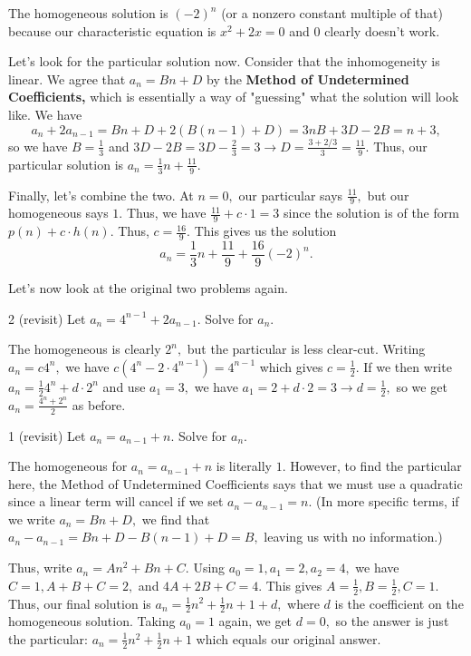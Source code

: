 \begin{solution}
    The homogeneous solution is $(-2)^n$ (or a nonzero constant multiple of that) because our characteristic equation is $x^2+2x=0$ and $0$ clearly doesn't work.

    Let's look for the particular solution now. Consider that the inhomogeneity is linear. We agree that $a_n=Bn+D$ by the \textbf{Method of Undetermined Coefficients,} which is essentially a way of "guessing" what the solution will look like. We have $$a_n+2a_{n-1}=Bn+D+2(B(n-1)+D)=3nB+3D-2B=n+3,$$ so we have $B=\frac{1}{3}$ and $3D-2B=3D-\frac{2}{3}=3\rightarrow D=\frac{3+2/3}{3}=\frac{11}{9}.$ Thus, our particular solution is $a_n=\frac{1}{3}n+\frac{11}{9}$.
    
    Finally, let's combine the two. At $n=0,$ our particular says $\frac{11}{9},$ but our homogeneous says $1.$ Thus, we have $\frac{11}{9}+c\cdot 1=3$ since the solution is of the form $p(n)+c\cdot h(n).$ Thus, $c=\frac{16}{9}.$ This gives us the solution
    $$a_n=\boxed{\frac{1}{3}n+\frac{11}{9}+\frac{16}{9}(-2)^n}.$$
\end{solution}

Let's now look at the original two problems again.

\begin{problem}{2 (revisit)}
    Let $a_n=4^{n-1}+2a_{n-1}.$ Solve for $a_n.$
\end{problem}

\begin{solution}
    The homogeneous is clearly $2^n,$ but the particular is less clear-cut. Writing $a_n=c4^n,$ we have $c(4^n-2\cdot 4^{n-1})=4^{n-1}$ which gives $c=\frac{1}{2}.$ If we then write $a_n=\frac{1}{2}4^n+d\cdot 2^n$ and use $a_1=3,$ we have $a_1=2+d\cdot 2=3\rightarrow d=\frac{1}{2},$ so we get $a_n=\frac{4^n+2^n}{2}$ as before.
\end{solution}

\begin{problem}{1 (revisit)}
    Let $a_n=a_{n-1}+n.$ Solve for $a_n.$
\end{problem}

\begin{solution}
    The homogeneous for $a_n=a_{n-1}+n$ is literally $1$. However, to find the particular here, the Method of Undetermined Coefficients says that we must use a quadratic since a linear term will cancel if we set $a_n-a_{n-1}=n.$ (In more specific terms, if we write $a_n=Bn+D,$ we find that $a_n-a_{n-1}=Bn+D-B(n-1)+D=B,$ leaving us with no information.)

    Thus, write $a_n=An^2+Bn+C.$ Using $a_0=1, a_1=2, a_2=4,$ we have $C=1, A+B+C=2,$ and $4A+2B+C=4.$ This gives $A=\frac{1}{2}, B=\frac{1}{2}, C=1.$ Thus, our final solution is $a_n=\frac{1}{2}n^2+\frac{1}{2}n+1+d,$ where $d$ is the coefficient on the homogeneous solution. Taking $a_0=1$ again, we get $d=0,$ so the answer is just the particular: $a_n=\boxed{\frac{1}{2}n^2+\frac{1}{2}n+1}$ which equals our original answer.
    
\end{solution}
